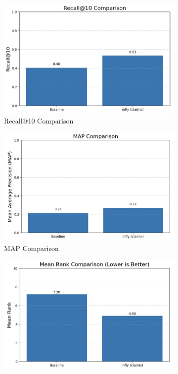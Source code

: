 \documentclass[11pt,a4paper]{article}
\begin{document}
\begin{figure}[H]
    \centering
    \begin{subfigure}{0.32\linewidth}
        \centering
        \includegraphics[width=\linewidth]{figs-recall10_comparison.png}
        \caption{Recall@10 Comparison}
    \end{subfigure}
    \hfill
    \begin{subfigure}{0.32\linewidth}
        \centering
        \includegraphics[width=\linewidth]{figs-map_comparison.png}
        \caption{MAP Comparison}
    \end{subfigure}
    \hfill
    \begin{subfigure}{0.32\linewidth}
        \centering
        \includegraphics[width=\linewidth]{figs-meanrank_comparison.png}

\end{subfigure}
\end{figure}
\end{document}
